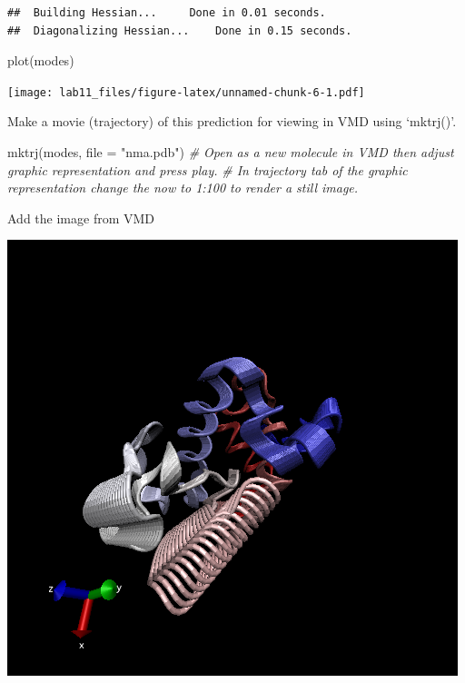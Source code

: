 \documentclass[
]{article}
\newenvironment{Shaded}{\begin{snugshade}}{\end{snugshade}}
\newcommand{\AttributeTok}[1]{\textcolor[rgb]{0.77,0.63,0.00}{#1}}
\newcommand{\CommentTok}[1]{\textcolor[rgb]{0.56,0.35,0.01}{\textit{#1}}}
\newcommand{\FunctionTok}[1]{\textcolor[rgb]{0.00,0.00,0.00}{#1}}
\newcommand{\NormalTok}[1]{#1}
\newcommand{\StringTok}[1]{\textcolor[rgb]{0.31,0.60,0.02}{#1}}
\begin{document}
\begin{verbatim}
##  Building Hessian...     Done in 0.01 seconds.
##  Diagonalizing Hessian...    Done in 0.15 seconds.
\end{verbatim}

\begin{Shaded}
\begin{Highlighting}[]
\FunctionTok{plot}\NormalTok{(modes)}
\end{Highlighting}
\end{Shaded}

\texttt{[image: lab11\_files/figure-latex/unnamed-chunk-6-1.pdf]}

Make a movie (trajectory) of this prediction for viewing in VMD using
`mktrj()'.

\begin{Shaded}
\begin{Highlighting}[]
\FunctionTok{mktrj}\NormalTok{(modes, }\AttributeTok{file =} \StringTok{"nma.pdb"}\NormalTok{)}
\CommentTok{\# Open as a \textquotesingle{}new molecule\textquotesingle{} in VMD then adjust graphic representation and press play.}
\CommentTok{\# In trajectory tab of the graphic representation change the \textquotesingle{}now\textquotesingle{} to \textquotesingle{}1:100\textquotesingle{} to render a still image.}
\end{Highlighting}
\end{Shaded}

Add the image from VMD

\includegraphics{nma.tga.png}
\end{document}
